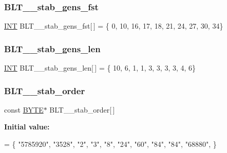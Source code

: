 \subsubsection{\texorpdfstring{B\+L\+T\+\_\+\_\+stab\+\_\+gens\+\_\+fst}{BLT\_41\_stab\_gens\_fst}}
{\footnotesize\ttfamily \mbox{\hyperlink{galois_8h_a09fddde158a3a20bd2dcadb609de11dc}{I\+NT}} B\+L\+T\+\_\+\_\+stab\+\_\+gens\+\_\+fst\mbox{[}$\,$\mbox{]} = \{ 0, 10, 16, 17, 18, 21, 24, 27, 30, 34\}}

\mbox{\label{data___b_l_t_8_c_aa86c745788cc9f9102817db5103c7825}} 
\subsubsection{\texorpdfstring{B\+L\+T\+\_\+\_\+stab\+\_\+gens\+\_\+len}{BLT\_41\_stab\_gens\_len}}
{\footnotesize\ttfamily \mbox{\hyperlink{galois_8h_a09fddde158a3a20bd2dcadb609de11dc}{I\+NT}} B\+L\+T\+\_\+\_\+stab\+\_\+gens\+\_\+len\mbox{[}$\,$\mbox{]} = \{ 10, 6, 1, 1, 3, 3, 3, 3, 4, 6\}}

\mbox{\label{data___b_l_t_8_c_ada436c9a32b08a93f3f59857f157693c}} 
\subsubsection{\texorpdfstring{B\+L\+T\+\_\+\_\+stab\+\_\+order}{BLT\_41\_stab\_order}}
{\footnotesize\ttfamily const \mbox{\hyperlink{galois_8h_ab6cc7b4aeb6ea31aba2b3fbfc83ff5e6}{B\+Y\+TE}}$\ast$ B\+L\+T\+\_\+\_\+stab\+\_\+order\mbox{[}$\,$\mbox{]}}

{\bfseries Initial value\+:}
\begin{DoxyCode}
= \{
\textcolor{stringliteral}{"5785920"},
\textcolor{stringliteral}{"3528"},
\textcolor{stringliteral}{"2"},
\textcolor{stringliteral}{"3"},
\textcolor{stringliteral}{"8"},
\textcolor{stringliteral}{"24"},
\textcolor{stringliteral}{"60"},
\textcolor{stringliteral}{"84"},
\textcolor{stringliteral}{"84"},
\textcolor{stringliteral}{"68880"},
\}
\end{DoxyCode}
\mbox{\label{data___b_l_t_8_c_ab4377d26627ba137ff991f1aa2ab536e}} 
